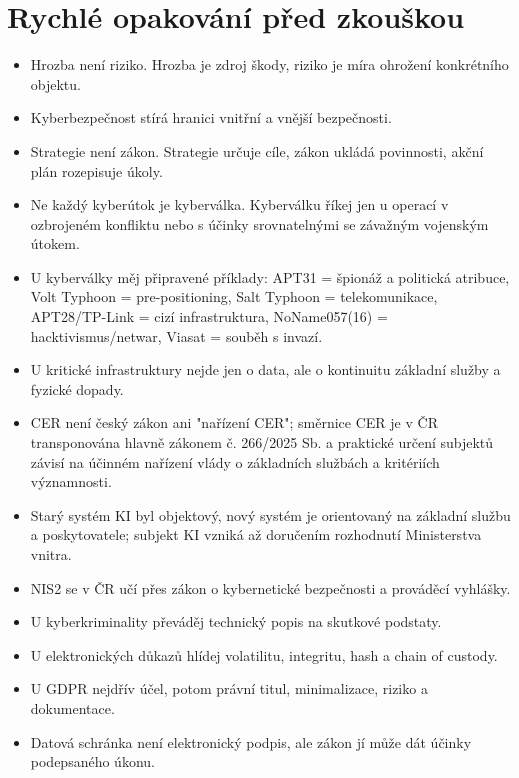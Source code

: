 
\newpage
\section*{Rychlé opakování před zkouškou}
\begin{itemize}
  \item Hrozba není riziko. Hrozba je zdroj škody, riziko je míra ohrožení konkrétního objektu.
  \item Kyberbezpečnost stírá hranici vnitřní a vnější bezpečnosti.
  \item Strategie není zákon. Strategie určuje cíle, zákon ukládá povinnosti, akční plán rozepisuje úkoly.
  \item Ne každý kyberútok je kyberválka. Kyberválku říkej jen u operací v ozbrojeném konfliktu nebo s účinky srovnatelnými se závažným vojenským útokem.
  \item U kyberválky měj připravené příklady: APT31 = špionáž a politická atribuce, Volt Typhoon = pre-positioning, Salt Typhoon = telekomunikace, APT28/TP-Link = cizí infrastruktura, NoName057(16) = hacktivismus/netwar, Viasat = souběh s invazí.
  \item U kritické infrastruktury nejde jen o data, ale o kontinuitu základní služby a fyzické dopady.
  \item CER není český zákon ani "nařízení CER"; směrnice CER je v ČR transponována hlavně zákonem č. 266/2025 Sb. a praktické určení subjektů závisí na účinném nařízení vlády o základních službách a kritériích významnosti.
  \item Starý systém KI byl objektový, nový systém je orientovaný na základní službu a poskytovatele; subjekt KI vzniká až doručením rozhodnutí Ministerstva vnitra.
  \item NIS2 se v ČR učí přes zákon o kybernetické bezpečnosti a prováděcí vyhlášky.
  \item U kyberkriminality převáděj technický popis na skutkové podstaty.
  \item U elektronických důkazů hlídej volatilitu, integritu, hash a chain of custody.
  \item U GDPR nejdřív účel, potom právní titul, minimalizace, riziko a dokumentace.
  \item Datová schránka není elektronický podpis, ale zákon jí může dát účinky podepsaného úkonu.
\end{itemize}

